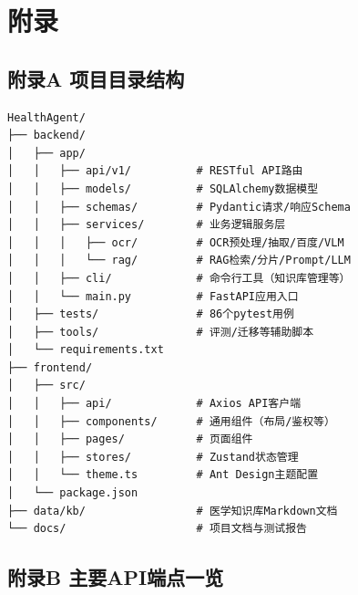 \documentclass[zihao=-4,a4paper]{ctexart}
\begin{document}
\newpage
\section*{附\hspace{2em}录}

\subsection*{附录A 项目目录结构}

\begin{lstlisting}[basicstyle=\ttfamily\zihao{5}, numbers=none]
HealthAgent/
├── backend/
│   ├── app/
│   │   ├── api/v1/          # RESTful API路由
│   │   ├── models/          # SQLAlchemy数据模型
│   │   ├── schemas/         # Pydantic请求/响应Schema
│   │   ├── services/        # 业务逻辑服务层
│   │   │   ├── ocr/         # OCR预处理/抽取/百度/VLM
│   │   │   └── rag/         # RAG检索/分片/Prompt/LLM
│   │   ├── cli/             # 命令行工具（知识库管理等）
│   │   └── main.py          # FastAPI应用入口
│   ├── tests/               # 86个pytest用例
│   ├── tools/               # 评测/迁移等辅助脚本
│   └── requirements.txt
├── frontend/
│   ├── src/
│   │   ├── api/             # Axios API客户端
│   │   ├── components/      # 通用组件（布局/鉴权等）
│   │   ├── pages/           # 页面组件
│   │   ├── stores/          # Zustand状态管理
│   │   └── theme.ts         # Ant Design主题配置
│   └── package.json
├── data/kb/                 # 医学知识库Markdown文档
└── docs/                    # 项目文档与测试报告
\end{lstlisting}

\subsection*{附录B 主要API端点一览}
\end{document}
